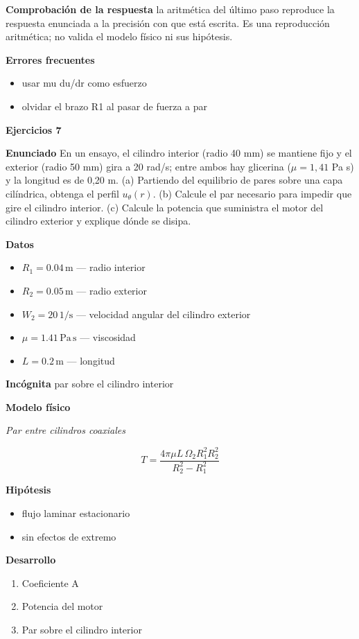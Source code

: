 \documentclass[10pt,openany]{book}
\begin{document}
\noindent\textbf{Comprobación de la respuesta} la aritmética del último paso reproduce la respuesta enunciada a la precisión con que está escrita. Es una reproducción aritmética; no valida el modelo físico ni sus hipótesis.

\noindent\textbf{Errores frecuentes}
\begin{itemize}
\item usar mu du/dr como esfuerzo
\item olvidar el brazo R1 al pasar de fuerza a par
\end{itemize}

\noindent\textbf{Ejercicios 7}

\noindent\textbf{Enunciado}
En un ensayo, el cilindro interior (radio 40 mm) se mantiene fijo y el exterior (radio 50 mm) gira a 20 rad/s; entre ambos hay glicerina (\(\mu = 1{,}41\) Pa s) y la longitud es de 0,20 m. (a) Partiendo del equilibrio de pares sobre una capa cilíndrica, obtenga el perfil \(u_\theta(r)\). (b) Calcule el par necesario para impedir que gire el cilindro interior. (c) Calcule la potencia que suministra el motor del cilindro exterior y explique dónde se disipa.

\noindent\textbf{Datos}
\begin{itemize}
\item $R_{1} = 0.04\,\mathrm{m}$ — radio interior
\item $R_{2} = 0.05\,\mathrm{m}$ — radio exterior
\item $W_{2} = 20\,\mathrm{1/s}$ — velocidad angular del cilindro exterior
\item $\mu = 1.41\,\mathrm{Pa}\,\mathrm{s}$ — viscosidad
\item $L = 0.2\,\mathrm{m}$ — longitud
\end{itemize}

\noindent\textbf{Incógnita}
par sobre el cilindro interior

\noindent\textbf{Modelo físico}

\noindent\textit{Par entre cilindros coaxiales}

\[
T = \frac{4\pi\mu L\,\Omega_2 R_1^{2}R_2^{2}}{R_2^{2} - R_1^{2}}
\]

\noindent\textbf{Hipótesis}
\begin{itemize}
\item flujo laminar estacionario
\item sin efectos de extremo
\end{itemize}

\noindent\textbf{Desarrollo}
\begin{enumerate}
\item
Coeficiente A
\item
Potencia del motor
\item
Par sobre el cilindro interior
\end{enumerate}
\end{document}
